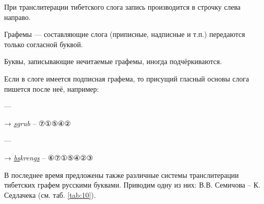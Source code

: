 При транслитерации тибетского слога запись производится в строчку слева направо.

Графемы --- составляющие слога (приписные, надписные и т.п.) передаются только согласной буквой.

Буквы, записывающие нечитаемые графемы, иногда подчёркиваются.

Если в слоге имеется подписная графема, то присущий гласный основы слога пишется после неё, например:

 ---
{\unifont →} \textit{\ul{s}grub} -- {\unifont ⑦①⑤④②}

 ---
{\unifont →} \textit{\ul{bs}kreng\ul{s}} -- {\unifont ⑥⑦①⑤④②③}

В последнее время предложены также различные системы транслитерации тибетских графем русскими буквами. Приводим одну из них: В.В. Семичова -- К. Седлачека (см. таб. \ref{tab:10}).

